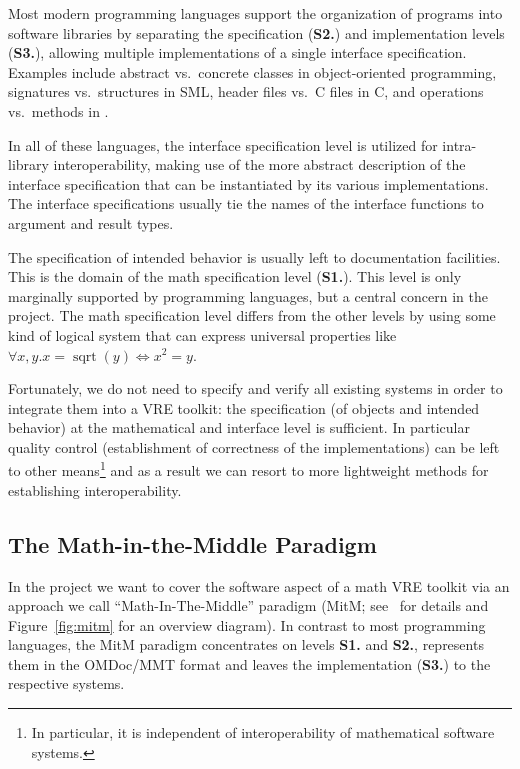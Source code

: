 Most modern programming languages support the organization of programs into software
libraries by separating the specification (\textbf{S2.}) and implementation levels
(\textbf{S3.}), allowing multiple implementations of a single interface specification. Examples include
abstract vs.~concrete classes in object-oriented programming, signatures vs.~structures in
SML, header files vs.~C files in C, and operations vs.~methods in \GAP.

In all of these languages, the interface specification level is utilized for intra-library interoperability, making use
of the more abstract description of the interface specification that can be instantiated
by its various implementations. The interface specifications usually tie the names of the
interface functions to argument and result types.

The specification of intended behavior is usually left to documentation facilities. This is the domain of the math specification
level (\textbf{S1.}).
This level is only marginally supported by programming languages, but a
central concern in the \pn project.
The math specification level differs from the other levels by using some kind of logical system that can express universal properties like
$\forall x,y. x=\operatorname{sqrt}(y) \Leftrightarrow x^2=y$.

Fortunately, we do not need to specify and verify all existing systems in order to integrate them into a VRE toolkit: the specification (of objects and intended behavior) at the mathematical and interface level is sufficient. In particular quality control
(establishment of correctness of the implementations) can be left to other
means\footnote{In particular, it is independent of interoperability of mathematical
  software systems.} and as a result we can resort to more lightweight methods for
establishing interoperability.

\subsection{The Math-in-the-Middle Paradigm}

In the \pn project we want to cover the software aspect of a math VRE toolkit via an
approach we call ``Math-In-The-Middle'' paradigm (MitM; see~\cite{DehKohKon:iop16} for
details and Figure~\ref{fig:mitm} for an overview diagram). In contrast to most
programming languages, the MitM paradigm concentrates on levels \textbf{S1.} and \textbf{S2.},
represents them in the OMDoc/MMT format and leaves the implementation (\textbf{S3.}) to
the respective systems.

